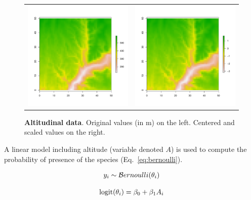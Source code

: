 \documentclass[a4paper, 12pt, leqno]{article}\usepackage[]{graphicx}\usepackage[]{color}
\newcommand{\logit}{\text{logit}}
\begin{document}
\begin{figure} 
  \begin{tabular}{cc}
    \includegraphics[width=8cm]{figures/Altitude1.pdf} &
    \includegraphics[width=8cm]{figures/Altitude2.pdf} \\
  \end{tabular}
  \caption{\textbf{Altitudinal data}. Original values (in m) on the left. Centered and
    scaled values on the right.}
  \label{fig:Altitude}
\end{figure}

A linear model including altitude (variable denoted $A$) is used to compute the
probability of presence of the species (Eq.~\ref{eq:bernoulli}).

\begin{equation}
  \begin{tabular}{c}
    $y_i \sim \mathcal{B}ernoulli(\theta_i)$ \\
    ~ \\
    $\logit(\theta_i) = \beta_0 + \beta_1 A_i$ \\
  \end{tabular}
  \label{eq:bernoulli}
\end{equation}
\end{document}
